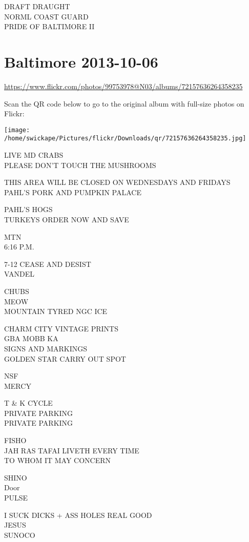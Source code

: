 \documentclass[10pt,letterpaper]{article}
\begin{document}
DRAFT DRAUGHT\\
NORML COAST GUARD\\
PRIDE OF BALTIMORE II
\pagebreak

\section*{Baltimore 2013-10-06}

\url{https://www.flickr.com/photos/99753978@N03/albums/72157636264358235}

Scan the QR code below to go to the original album with full-size photos on Flickr:

\texttt{[image: /home/swickape/Pictures/flickr/Downloads/qr/72157636264358235.jpg]}
\pagebreak

LIVE MD CRABS\\
PLEASE DON'T TOUCH THE MUSHROOMS

THIS AREA WILL BE CLOSED ON WEDNESDAYS AND FRIDAYS\\
PAHL'S PORK AND PUMPKIN PALACE

PAHL'S HOGS\\
TURKEYS ORDER NOW AND SAVE

MTN\\
6:16 P.M.

7{-}12 CEASE AND DESIST\\
VANDEL

CHUBS\\
MEOW\\
MOUNTAIN TYRED NGC ICE

CHARM CITY VINTAGE PRINTS\\
GBA MOBB KA\\
SIGNS AND MARKINGS\\
GOLDEN STAR CARRY OUT SPOT

NSF\\
MERCY

T \& K CYCLE\\
PRIVATE PARKING\\
PRIVATE PARKING

FISHO\\
JAH RAS TAFAI LIVETH EVERY TIME\\
TO WHOM IT MAY CONCERN

SHINO\\
Door\\
PULSE

I SUCK DICKS + ASS HOLES REAL GOOD\\
JESUS\\
SUNOCO
\end{document}

